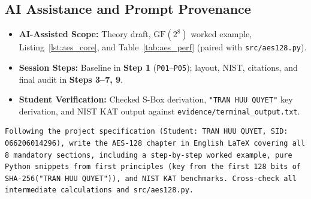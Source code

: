 \subsection*{AI Assistance and Prompt Provenance}
\begin{itemize}
    \item \textbf{AI-Assisted Scope:} Theory draft, $\text{GF}(2^8)$ worked example, Listing~\ref{lst:aes_core}, and Table~\ref{tab:aes_perf} (paired with \texttt{src/aes128.py}).
    \item \textbf{Session Steps:} Baseline in \textbf{Step 1} (\texttt{P01}--\texttt{P05}); layout, NIST, citations, and final audit in \textbf{Steps 3--7, 9}.
    \item \textbf{Student Verification:} Checked S-Box derivation, \texttt{"TRAN HUU QUYET"} key derivation, and NIST KAT output against \texttt{evidence/\allowbreak terminal\_output.txt}.
\end{itemize}
\begin{lstlisting}[style=promptstyle, caption={Compact Prompt (R-REP-01) for Chapter 1: AES-128.}, label={lst:prompt_ch1}]
Following the project specification (Student: TRAN HUU QUYET, SID: 066206014296), write the AES-128 chapter in English LaTeX covering all 8 mandatory sections, including a step-by-step worked example, pure Python snippets from first principles (key from the first 128 bits of SHA-256("TRAN HUU QUYET")), and NIST KAT benchmarks. Cross-check all intermediate calculations and src/aes128.py.
\end{lstlisting}
